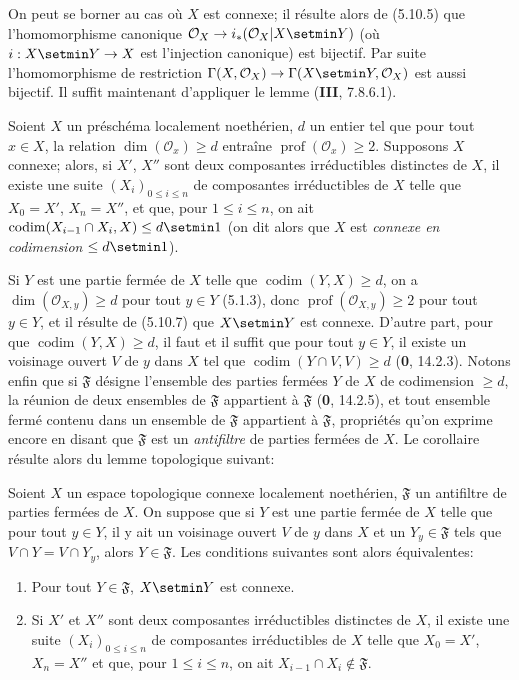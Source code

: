 On peut se borner au cas où $X$ est connexe; il résulte alors de (5.10.5) que
l'homomorphisme canonique
$\mathcal O_X\to i_*(\mathcal O_X|X\setmin Y)$ (où $i:X\setmin Y\to X$ est l'injection
canonique) est bijectif. Par suite l'homomorphisme de restriction
$\Gamma(X,\mathcal O_X)\to\Gamma(X\setmin Y,\mathcal O_X)$ est aussi bijectif. Il
suffit maintenant d'appliquer le lemme (\textbf{III}, 7.8.6.1).

\begin{corollary}[5.10.8]
\label{IV.2.s5.10.8-fr}
Soient $X$ un préschéma localement noethérien, $d$ un entier tel que pour tout
$x\in X$, la relation $\dim(\mathcal O_x)\geq d$ entraîne
$\operatorname{prof}(\mathcal O_x)\geq2$. Supposons $X$ connexe; alors, si
$X'$, $X''$ sont deux composantes irréductibles distinctes de $X$, il existe
une suite $(X_i)_{0\leq i\leq n}$ de composantes irréductibles de $X$ telle
que $X_0=X'$, $X_n=X''$, et que, pour $1\leq i\leq n$, on ait
$\operatorname{codim}(X_{i-1}\cap X_i,X)\leq d\setmin 1$
\textup{(on dit alors que $X$ est \emph{connexe en codimension} $\leq d\setmin 1$)}.
\end{corollary}

Si $Y$ est une partie fermée de $X$ telle que
$\operatorname{codim}(Y,X)\geq d$, on a $\dim(\mathcal O_{X,y})\geq d$ pour
tout $y\in Y$ (5.1.3), donc $\operatorname{prof}(\mathcal O_{X,y})\geq2$ pour
tout $y\in Y$, et il résulte de (5.10.7) que $X\setmin Y$ est connexe. D'autre part,
pour que $\operatorname{codim}(Y,X)\geq d$, il faut et il suffit que pour tout
$y\in Y$, il existe un voisinage ouvert $V$ de $y$ dans $X$ tel que
$\operatorname{codim}(Y\cap V,V)\geq d$ (\textbf{0}, 14.2.3). Notons enfin que si
$\mathfrak F$ désigne l'ensemble des parties fermées $Y$ de $X$ de
codimension $\geq d$, la réunion de deux ensembles de $\mathfrak F$ appartient
à $\mathfrak F$ (\textbf{0}, 14.2.5), et tout ensemble fermé contenu dans un ensemble
de $\mathfrak F$ appartient à $\mathfrak F$, propriétés qu'on exprime encore
en disant que $\mathfrak F$ est un \emph{antifiltre} de parties fermées de
$X$. Le corollaire résulte alors du lemme topologique suivant:

\begin{lemma}[5.10.8.1]
\label{IV.2.s5.10.8.1-fr}
Soient $X$ un espace topologique connexe localement noethérien,
$\mathfrak F$ un antifiltre de parties fermées de $X$. On suppose que si $Y$
est une partie fermée de $X$ telle que pour tout $y\in Y$, il y ait un
voisinage ouvert $V$ de $y$ dans $X$ et un $Y_y\in\mathfrak F$ tels que
$V\cap Y=V\cap Y_y$, alors $Y\in\mathfrak F$. Les conditions suivantes sont
alors équivalentes:
\begin{enumerate}
\item[\textup{a)}] Pour tout $Y\in\mathfrak F$, $X\setmin Y$ est connexe.
\item[\textup{b)}] Si $X'$ et $X''$ sont deux composantes irréductibles distinctes de
$X$, il existe une suite $(X_i)_{0\leq i\leq n}$ de composantes irréductibles
de $X$ telle que $X_0=X'$, $X_n=X''$ et que, pour $1\leq i\leq n$, on ait
$X_{i-1}\cap X_i\notin\mathfrak F$.
\end{enumerate}
\end{lemma}

